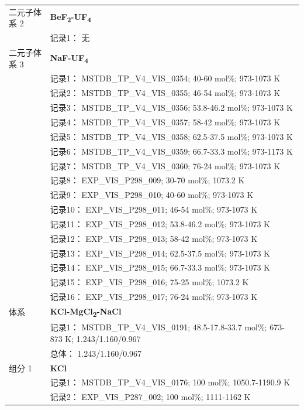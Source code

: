 \documentclass[12pt]{article}
\begin{document}
{\begin{longtable}[]{@{}
  >{\raggedright\arraybackslash}p{}
  >{\raggedright\arraybackslash}p{}@{}}
二元子体系 2 & \textbf{BeF\textsubscript{2}-UF\textsubscript{4}} \\
 & 记录1： 无 \\
二元子体系 3  & \textbf{NaF-UF\textsubscript{4}} \\
 & 记录1： MSTDB\_TP\_V4\_VIS\_0354; 40-60 mol\%; 973-1073 K \\
 & 记录2： MSTDB\_TP\_V4\_VIS\_0355; 46-54 mol\%; 973-1073 K \\
 & 记录3： MSTDB\_TP\_V4\_VIS\_0356; 53.8-46.2 mol\%; 973-1073 K \\
 & 记录4： MSTDB\_TP\_V4\_VIS\_0357; 58-42 mol\%; 973-1073 K \\
 & 记录5： MSTDB\_TP\_V4\_VIS\_0358; 62.5-37.5 mol\%; 973-1073 K \\
 & 记录6： MSTDB\_TP\_V4\_VIS\_0359; 66.7-33.3 mol\%; 973-1173 K \\
 & 记录7： MSTDB\_TP\_V4\_VIS\_0360; 76-24 mol\%; 973-1073 K \\
 & 记录8： EXP\_VIS\_P298\_009; 30-70 mol\%; 1073.2 K \\
 & 记录9： EXP\_VIS\_P298\_010; 40-60 mol\%; 973-1073 K \\
 & 记录10： EXP\_VIS\_P298\_011; 46-54 mol\%; 973-1073 K \\
 & 记录11： EXP\_VIS\_P298\_012; 53.8-46.2 mol\%; 973-1073 K \\
 & 记录12： EXP\_VIS\_P298\_013; 58-42 mol\%; 973-1073 K \\
 & 记录13： EXP\_VIS\_P298\_014; 62.5-37.5 mol\%; 973-1073 K \\
 & 记录14： EXP\_VIS\_P298\_015; 66.7-33.3 mol\%; 973-1073 K \\
 & 记录15： EXP\_VIS\_P298\_016; 75-25 mol\%; 1073.2 K \\
 & 记录16： EXP\_VIS\_P298\_017; 76-24 mol\%; 973-1073 K  \\

\midrule
体系 & \textbf{KCl-MgCl\textsubscript{2}-NaCl} \\
 & 记录1： MSTDB\_TP\_V4\_VIS\_0191; 48.5-17.8-33.7 mol\%; 673-873 K; 1.243/1.160/0.967 \\
 & 总体： 1.243/1.160/0.967  \\

组分 1  & \textbf{KCl} \\
 & 记录1： MSTDB\_TP\_V4\_VIS\_0176; 100 mol\%; 1050.7-1190.9 K \\
 & 记录2： EXP\_VIS\_P287\_002; 100 mol\%; 1111-1162 K  \\


\end{longtable}}
\end{document}
